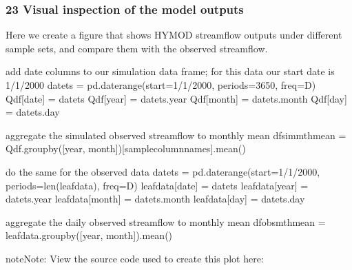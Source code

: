 \documentclass[letterpaper,10pt,english]{book}
\begin{document}
\subsubsection{2\sphinxhyphen{}3 Visual inspection of the model outputs}
\label{\detokenize{A2_Jupyter_Notebooks:visual-inspection-of-the-model-outputs}}
\sphinxAtStartPar
Here we create a figure that shows HYMOD streamflow outputs under
different sample sets, and compare them with the observed streamflow.

\begin{sphinxVerbatim}[commandchars=\\\{\}]
\PYGZsh{} add date columns to our simulation data frame; for this data our start date is 1/1/2000
date\PYGZus{}ts = pd.date\PYGZus{}range(start=\PYGZsq{}1/1/2000\PYGZsq{}, periods=3650, freq=\PYGZsq{}D\PYGZsq{})
Q\PYGZus{}df[\PYGZsq{}date\PYGZsq{}] = date\PYGZus{}ts
Q\PYGZus{}df[\PYGZsq{}year\PYGZsq{}] = date\PYGZus{}ts.year
Q\PYGZus{}df[\PYGZsq{}month\PYGZsq{}] = date\PYGZus{}ts.month
Q\PYGZus{}df[\PYGZsq{}day\PYGZsq{}] = date\PYGZus{}ts.day

\PYGZsh{} aggregate the simulated observed streamflow to monthly mean
df\PYGZus{}sim\PYGZus{}mth\PYGZus{}mean = Q\PYGZus{}df.groupby([\PYGZsq{}year\PYGZsq{}, \PYGZsq{}month\PYGZsq{}])[sample\PYGZus{}column\PYGZus{}names].mean()

\PYGZsh{} do the same for the observed data
date\PYGZus{}ts = pd.date\PYGZus{}range(start=\PYGZsq{}1/1/2000\PYGZsq{}, periods=len(leaf\PYGZus{}data), freq=\PYGZsq{}D\PYGZsq{})
leaf\PYGZus{}data[\PYGZsq{}date\PYGZsq{}] = date\PYGZus{}ts
leaf\PYGZus{}data[\PYGZsq{}year\PYGZsq{}] = date\PYGZus{}ts.year
leaf\PYGZus{}data[\PYGZsq{}month\PYGZsq{}] = date\PYGZus{}ts.month
leaf\PYGZus{}data[\PYGZsq{}day\PYGZsq{}] = date\PYGZus{}ts.day

\PYGZsh{} aggregate the daily observed streamflow to monthly mean
df\PYGZus{}obs\PYGZus{}mth\PYGZus{}mean = leaf\PYGZus{}data.groupby([\PYGZsq{}year\PYGZsq{}, \PYGZsq{}month\PYGZsq{}]).mean()
\end{sphinxVerbatim}

\begin{sphinxadmonition}{note}{Note:}
\sphinxAtStartPar
{} View the source code used to create this plot here:  
\end{sphinxadmonition}
\end{document}
